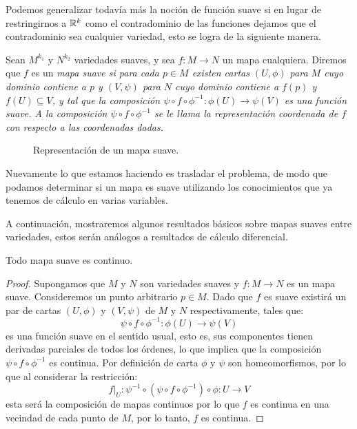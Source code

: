 Podemos generalizar todavía más la noción de función suave si en lugar de restringirnos a $\mathbb{R}^k$ como el contradominio de las funciones dejamos que el contradominio sea cualquier variedad, esto se logra de la siguiente manera.

\begin{definition}\label{Definición: Mapa Suave}
	Sean $M^{k_1}$ y $N^{k_2}$ variedades suaves, y sea $f: M \to N$ un mapa cualquiera. Diremos que $f$ es un \it{mapa suave} si para cada $p \in M$ existen cartas $(U,\phi)$ para $M$ cuyo dominio contiene a $p$ y $(V,\psi)$ para $N$ cuyo dominio contiene a $f(p)$ y $f(U) \subseteq V$, y tal que la composición $\psi \circ f \circ \phi^{-1}: \phi(U) \to \psi(V)$ es una función suave. A la composición $\psi \circ f \circ \phi^{-1}$ se le llama la \it{representación coordenada de} $f$ con respecto a las coordenadas dadas.
\end{definition}

\begin{figure}[h]
	\centering
	\scalebox{.80}{}
	\caption{Representación de un mapa suave.}
\end{figure}

Nuevamente lo que estamos haciendo es trasladar el problema, de modo que podamos determinar si un mapa es suave utilizando los conocimientos que ya tenemos de cálculo en varias variables.

A continuación, mostraremos algunos resultados básicos sobre mapas suaves entre variedades, estos serán análogos a resultados de cálculo diferencial.

\begin{theorem}
	Todo mapa suave es continuo.
\end{theorem}

\begin{proof}
	Supongamos que $M$ y $N$ son variedades suaves y $f: M \to N$ es un mapa suave. Consideremos un punto arbitrario $p \in M$. Dado que $f$ es suave existirá un par de cartas $(U,\phi)$ y $(V,\psi)$ de $M$ y $N$ respectivamente, tales que:
	\[
		\psi \circ f \circ \phi^{-1}: \phi(U) \to \psi(V)
	\]
	es una función suave en el sentido usual, esto es, sus componentes tienen derivadas parciales de todos los órdenes, lo que implica que la composición $\psi \circ f \circ \phi^{-1}$ es continua. Por definición de carta $\phi$ y $\psi$ son homeomorfismos, por lo que al considerar la restricción:
	\[
		f |_{U} : \psi^{-1} \circ (\psi \circ f \circ \phi^{-1}) \circ \phi : U \to V
	\]
	esta será la composición de mapas continuos por lo que $f$ es continua en una vecindad de cada punto de $M$, por lo tanto, $f$ es continua.
\end{proof}

